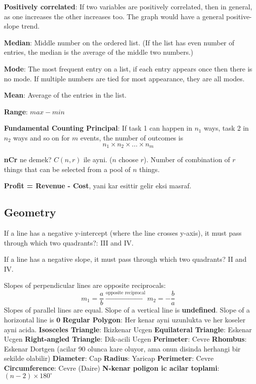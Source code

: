 \documentclass{ximera}
\begin{document}
\textbf{Positively correlated}: If two variables are positively correlated, then in general, as one increases the other increases too. The graph would have a general positive-slope trend. \par

\textbf{Median}: Middle number on the ordered list. (If the list has even number of entries, the median is the average of the middle two numbers.) \par

\textbf{Mode}: The most frequent entry on a list, if each entry appears once then there is no mode. If multiple numbers are tied for most appearance, they are all modes. \par

\textbf{Mean}: Average of the entries in the list. \par 

\textbf{Range}: $max - min$ \par

\textbf{Fundamental Counting Principal}: If task 1 can happen in $n_1$ ways, task 2 in $n_2$ ways and so on for $m$ events, the number of outcomes is
$$
n_1\times n_2 \times ... \times n_m
$$

\textbf{nCr} ne demek? $C(n,r)$ ile ayni. ($n$ choose $r$). Number of combination of $r$ things that can be selected from a pool of $n$ things.

\textbf{Profit = Revenue - Cost}, yani kar esittir gelir eksi masraf.
\subsection{Geometry}
If a line has a negative y-intercept (where the line crosses y-axis), it must pass through which two quadrants?: III and IV. \par

If a line has a negative slope, it  must pass through which two quadrants? II and IV. \par 

Slopes of perpendicular lines are opposite reciprocals:
$$
m_1 = \frac{a}{b} \xrightarrow{\text{opposite reciprocal}} m_2 = -\frac{b}{a}
$$
Slopes of parallel lines are equal.
Slope of a vertical line is \textbf{undefined}.
Slope of a horizontal line is $\mathbf{0}$
\textbf{Regular Polygon}: Her kenar ayni uzunlukta ve her koseler ayni acida.
\textbf{Isosceles Triangle}: Ikizkenar Ucgen
\textbf{Equilateral Triangle}: Eskenar Ucgen
\textbf{Right-angled Triangle}: Dik-acili Ucgen
\textbf{Perimeter}: Cevre
\textbf{Rhombus}: Eskenar Dortgen (acilar 90 olunca kare oluyor, ama onun disinda herhangi bir sekilde olabilir)
\textbf{Diameter}: Cap
\textbf{Radius}: Yaricap
\textbf{Perimeter}: Cevre
\textbf{Circumference}: Cevre (Daire)
\textbf{N-kenar poligon ic acilar toplami}: $(n-2)\times 180^\circ$
\end{document}
